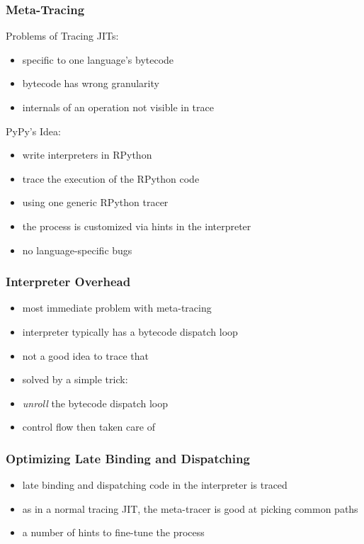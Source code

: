 \documentclass[utf8x]{beamer}
\begin{document}
\begin{frame}
  \frametitle{Meta-Tracing}
  Problems of Tracing JITs:
  \begin{itemize}
      \item specific to one language's bytecode
      \item bytecode has wrong granularity
      \item internals of an operation not visible in trace
  \end{itemize}
  \pause
  \begin{block}{PyPy's Idea:}
      \begin{itemize}
          \item write interpreters in RPython
          \item trace the execution of the RPython code
          \item using one generic RPython tracer
          \item the process is customized via hints in the interpreter
          \item no language-specific bugs
      \end{itemize}
  \end{block}
\end{frame}

\begin{frame}
  \frametitle{Interpreter Overhead}
  \begin{itemize}
      \item most immediate problem with meta-tracing
      \item interpreter typically has a bytecode dispatch loop
      \item not a good idea to trace that
      \pause
      \item solved by a simple trick:
      \item \emph{unroll} the bytecode dispatch loop
      \item control flow then taken care of
  \end{itemize}
\end{frame}

\begin{frame}
  \frametitle{Optimizing Late Binding and Dispatching}
  \begin{itemize}
      \item late binding and dispatching code in the interpreter is traced
      \item as in a normal tracing JIT, the meta-tracer is good at picking common paths
      \item a number of hints to fine-tune the process
  \end{itemize}
\end{frame}
\end{document}
